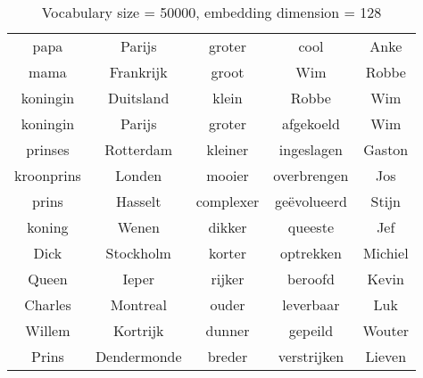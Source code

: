 \begin{table}[H]
\centering
\caption[Vocabulary size = 50000, embedding dimension = 128]{Vocabulary size = 50000, embedding dimension = 128}
\label{tab:emb_experiments_relations}
\begin{tabular}{|c|c|c|c|c|}
\hline
papa & Parijs & groter & cool & Anke \\
mama & Frankrijk & groot & Wim & Robbe \\
koningin & Duitsland & klein & Robbe & Wim \\ \hline \hline
koningin & Parijs & groter & afgekoeld & Wim\\
prinses & Rotterdam & kleiner & ingeslagen & Gaston\\
kroonprins & Londen & mooier & overbrengen & Jos\\
prins & Hasselt & complexer & geëvolueerd & Stijn\\
koning & Wenen & dikker & queeste & Jef\\
Dick & Stockholm & korter & optrekken & Michiel\\
Queen & Ieper & rijker & beroofd & Kevin\\
Charles & Montreal & ouder & leverbaar & Luk\\
Willem & Kortrijk & dunner & gepeild & Wouter\\
Prins & Dendermonde & breder & verstrijken & Lieven\\
\hline
\end{tabular}
\end{table}

